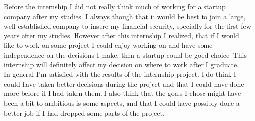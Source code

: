 Before the internship I did not really think much of working for a startup company after my studies. I always though that it would be best to join a large, well established company to insure my financial security, specially for the first few years after my studies. However after this internship I realized, that if I would like to work on some project I could enjoy working on and have some independence on the decisions I make, then a startup could be good choice. This internship will definitely affect my decision on where to work after I graduate. \\

In general I'm satisfied with the results of the internship project. I do think I could have taken better decisions during the project and that I could have done more before if I had taken them. I also think that the goals I chose might have been a bit to ambitious is some aspects, and that I could have possibly done a better job if I had dropped some parts of the project.  
